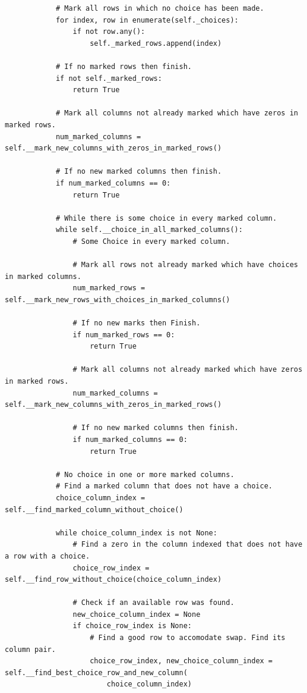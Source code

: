 \documentclass[12pt, letterpaper, twoside]{book}
\begin{document}
\begin{lstlisting}
            # Mark all rows in which no choice has been made.
            for index, row in enumerate(self._choices):
                if not row.any():
                    self._marked_rows.append(index)

            # If no marked rows then finish.
            if not self._marked_rows:
                return True

            # Mark all columns not already marked which have zeros in marked rows.
            num_marked_columns = self.__mark_new_columns_with_zeros_in_marked_rows()

            # If no new marked columns then finish.
            if num_marked_columns == 0:
                return True

            # While there is some choice in every marked column.
            while self.__choice_in_all_marked_columns():
                # Some Choice in every marked column.

                # Mark all rows not already marked which have choices in marked columns.
                num_marked_rows = self.__mark_new_rows_with_choices_in_marked_columns()

                # If no new marks then Finish.
                if num_marked_rows == 0:
                    return True

                # Mark all columns not already marked which have zeros in marked rows.
                num_marked_columns = self.__mark_new_columns_with_zeros_in_marked_rows()

                # If no new marked columns then finish.
                if num_marked_columns == 0:
                    return True

            # No choice in one or more marked columns.
            # Find a marked column that does not have a choice.
            choice_column_index = self.__find_marked_column_without_choice()

            while choice_column_index is not None:
                # Find a zero in the column indexed that does not have a row with a choice.
                choice_row_index = self.__find_row_without_choice(choice_column_index)

                # Check if an available row was found.
                new_choice_column_index = None
                if choice_row_index is None:
                    # Find a good row to accomodate swap. Find its column pair.
                    choice_row_index, new_choice_column_index = self.__find_best_choice_row_and_new_column(
                        choice_column_index)


\end{lstlisting}
\end{document}
